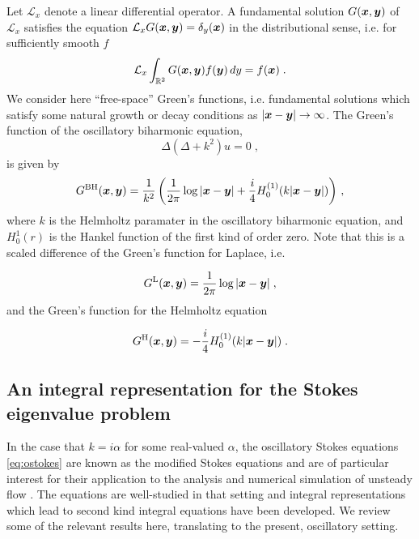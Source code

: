 Let $\mathcal{L}_x$ denote a linear differential operator. A fundamental
solution $G({\boldsymbol x},{\boldsymbol y})$ of $\mathcal{L}_x$ satisfies the equation
$\mathcal{L}_x G({\boldsymbol x},{\boldsymbol y}) = \delta_y({\boldsymbol x})$ in the distributional sense, i.e.
for sufficiently smooth $f$
\begin{equation}
  \mathcal{L}_x \int_{\mathbb{R}^2} G({\boldsymbol x},{\boldsymbol y}) f({\boldsymbol y}) \, dy = f({\boldsymbol x}) \; .
  \nonumber
\end{equation}
We consider here
``free-space'' Green's functions, i.e. fundamental solutions which satisfy
some natural growth or decay conditions as $|{\boldsymbol x}-{\boldsymbol y}| \to \infty$.
The Green's function of the oscillatory biharmonic equation,
\begin{equation}
  \Delta ( \Delta + k^2 ) u = 0 \; , \label{eq:obiharm} \nonumber
\end{equation}
is given by 
\begin{equation}
  G^{\textrm{BH}}({\boldsymbol x},{\boldsymbol y}) = \frac{1}{k^2}
  \left (\frac{1}{2\pi} \log |{\boldsymbol x}-{\boldsymbol y}| +
  \frac{i}{4} H_0^{(1)}(k|{\boldsymbol x}-{\boldsymbol y}|) \right ) \, ,
  \label{eq:Gbh}
\end{equation}
where $k$ is the Helmholtz paramater in the oscillatory biharmonic equation,
and $H_{0}^{1}(r)$ is the Hankel function of the first kind of order zero.
Note that this is a scaled difference of the Green's function for
Laplace, i.e.

\begin{equation}
  G^{\textrm{L}}({\boldsymbol x},{\boldsymbol y}) = \frac{1}{2\pi} \log |{\boldsymbol x}-{\boldsymbol y}| \; , \nonumber
\end{equation}
and the Green's function for the Helmholtz equation

\begin{equation}
  G^{\textrm{H}}({\boldsymbol x},{\boldsymbol y}) = -\frac{i}{4} H_0^{(1)}(k|{\boldsymbol x}-{\boldsymbol y}|) \; . \nonumber
\end{equation}

\subsection{An integral representation for the Stokes eigenvalue
  problem}

In the case that $k=i\alpha$ for some real-valued $\alpha$,
the oscillatory Stokes equations \cref{eq:ostokes}
are known as the modified Stokes equations and are of particular
interest for their application to the analysis and numerical
simulation of unsteady flow
\cite{pozrikidis1992boundary,biros2002embedded,
  jiang2013second,ladyzhenskaya1969mathematical}.
The equations are well-studied in that setting and
integral representations which lead to second kind
integral equations have been developed. We review
some of the relevant results here, translating to
the present, oscillatory setting.

